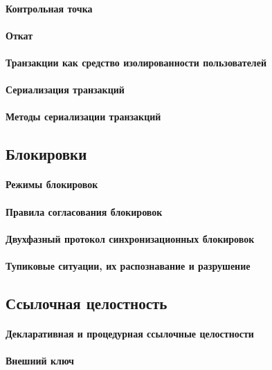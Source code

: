 \paragraph{Контрольная точка}
\paragraph{Откат}
\paragraph{Транзакции как средство изолированности пользователей}
\paragraph{Сериализация транзакций}
\paragraph{Методы сериализации транзакций}

\subsection{Блокировки}

\paragraph{Режимы блокировок}
\paragraph{Правила согласования блокировок}
\paragraph{Двухфазный протокол синхронизационных блокировок}
\paragraph{Тупиковые ситуации, их распознавание и разрушение}

\subsection{Ссылочная целостность}

\paragraph{Декларативная и процедурная ссылочные целостности}
\paragraph{Внешний ключ}
